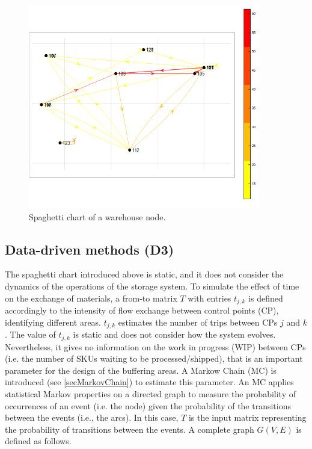 \begin{figure}[hbt!]
\centering
\includegraphics[width=0.9\textwidth]{SectionWarehouses/design_figures/fig_spaghetti_wh.png}
\captionsetup{type=figure}
\caption{Spaghetti chart of a warehouse node.}
\label{fig_spaghetti_wh}
\end{figure}

\subsection{Data-driven methods (D3)}
The spaghetti chart introduced above is static, and it does not consider the dynamics of the operations of the storage system. To simulate the effect of time on the exchange of materials, a from-to matrix $T$ with entries $t_{j,k}$ is defined accordingly to the intensity of flow exchange between control points (CP), identifying different areas. $t_{j,k}$ estimates the number of trips between CPs $j$ and $k$. The value of $t_{j,k}$ is static and does not consider how the system evolves. Nevertheless, it gives no information on the work in progress (WIP) between CPs (i.e. the number of SKUs waiting to be processed/shipped), that is an important parameter for the design of the buffering areas. A Markow Chain (MC) is introduced (see \ref{secMarkovChain}) to estimate this parameter. An MC applies statistical Markov properties on a directed graph to measure the probability of occurrences of an event (i.e. the node) given the probability of the transitions between the events (i.e., the arcs). In this case, $T$ is the input matrix representing the probability of transitions between the events. A complete graph $G\left(V,E\right)$ is defined as follows.

